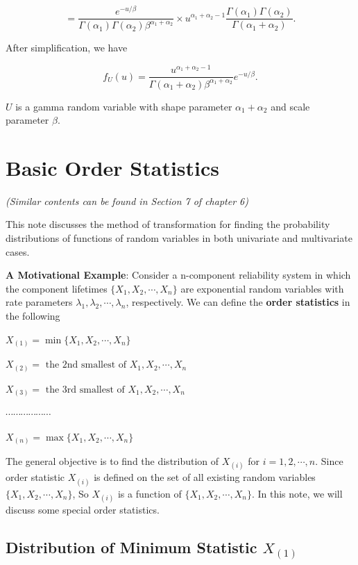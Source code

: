 \documentclass[
]{book}
\begin{document}
\[
= \frac{e^{-u/\beta }}{\Gamma(\alpha_1)\Gamma(\alpha_2)\beta^{\alpha_1+\alpha_2}}\times u^{\alpha_1+\alpha_2-1}\frac{\Gamma(\alpha_1)\Gamma(\alpha_2)}{\Gamma(\alpha_1+\alpha_2)}.  
\]

After simplification, we have

\[
f_U(u) = \frac{u^{\alpha_1+\alpha_2-1}}{\Gamma(\alpha_1+\alpha_2)\beta^{\alpha_1+\alpha_2}} e^{-u/\beta}.
\]

\(U\) is a gamma random variable with shape parameter \(\alpha_1 + \alpha_2\) and scale parameter \(\beta\).

\hfill\break

\hypertarget{basic-order-statistics}{%
\chapter{Basic Order Statistics}\label{basic-order-statistics}}

\emph{(Similar contents can be found in Section 7 of chapter 6)}

This note discusses the method of transformation for finding the probability distributions of functions of random variables in both univariate and multivariate cases.

\textbf{A Motivational Example}: Consider a n-component reliability system in which the component lifetimes \(\{ X_1, X_2, \cdots, X_n \}\) are exponential random variables with rate parameters \(\lambda_1, \lambda_2, \cdots, \lambda_n\), respectively. We can define the \textbf{\color{red} order statistics} in the following

\(X_{(1)} = \min \{X_1, X_2, \cdots, X_n \}\)

\(X_{(2)} = \text{ the 2nd smallest of } X_1, X_2, \cdots, X_n\)

\(X_{(3)} = \text{ the 3rd smallest of } X_1, X_2, \cdots, X_n\)

\(\cdots \cdots \cdots \cdots \cdots\cdots\)

\(X_{(n)} = \max \{X_1, X_2, \cdots, X_n \}\)

The general objective is to find the distribution of \(X_{(i)}\) for \(i = 1, 2, \cdots, n\). Since order statistic \(X_{(i)}\) is defined on the set of all existing random variables \(\{ X_1, X_2, \cdots, X_n \}\), So \(X_{(i)}\) is a function of \(\{ X_1, X_2, \cdots, X_n \}\). In this note, we will discuss some special order statistics.

\hfill\break

\hypertarget{distribution-of-minimum-statistic-x_1}{%
\section{\texorpdfstring{Distribution of Minimum Statistic \textbf{\(X_{(1)}\)}}{Distribution of Minimum Statistic X\_\{(1)\}}}\label{distribution-of-minimum-statistic-x_1}}
\end{document}
